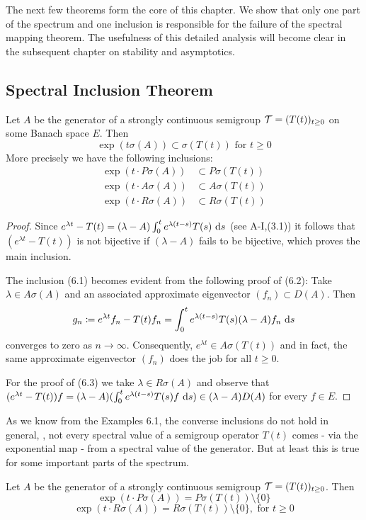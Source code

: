 The next few theorems form the core of this chapter. 
We show that only one part of the spectrum and one inclusion is responsible for the failure of the spectral mapping theorem.
The usefulness of this detailed analysis will become clear in the subsequent chapter on stability and asymptotics.
\subsection{Spectral Inclusion Theorem}\label{subsec:a3-6.2}
Let $A$ be the generator of a strongly continuous semigroup $\mathcal{T} = (T(t))_{t \geq 0}$ on some Banach space $E$.
Then
\[
\exp(t\sigma(A)) \subset \sigma(T(t)) \text{ for } t \geq 0
\]
More precisely we have the following inclusions:
\begin{align}
\exp(t \cdot P\sigma(A)) &\subset P\sigma(T(t)) \label{eq:a3-6.1} \\
\exp(t \cdot A\sigma(A)) &\subset A\sigma(T(t)) \label{eq:a3-6.2} \\
\exp(t \cdot R\sigma(A)) &\subset R\sigma(T(t)) \label{eq:a3-6.3}
\end{align}
\begin{proof}
Since $e^{\lambda t} - T(t) = (\lambda - A)\int_{0}^{t} e^{\lambda(t-s)}T(s) \, \mathop{}\!\mathrm{d}{s}$ (see A-I,(3.1)) it follows that $(e^{\lambda t} - T(t))$ is not bijective if $(\lambda - A)$ fails to be bijective, which proves the main inclusion.

The inclusion (6.1) becomes evident from the following proof of (6.2): Take $\lambda \in A\sigma(A)$ and an associated approximate eigenvector $(f_{n}) \subset D(A)$.
Then
\[
g_{n} \coloneqq e^{\lambda t}f_{n} - T(t)f_{n} = \int_{0}^{t} e^{\lambda(t-s)}T(s)(\lambda-A)f_{n} \, \mathop{}\!\mathrm{d}{s}
\]
converges to zero as $n \to \infty$.
Consequently, $e^{\lambda t} \in A\sigma(T(t))$ and in fact, the same approximate eigenvector $(f_{n})$ does the job for all $t \geq 0$.

For the proof of (6.3) we take $\lambda \in R\sigma(A)$ and observe that $(e^{\lambda t} - T(t))f = (\lambda - A)(\int_{0}^{t} e^{\lambda(t-s)}T(s)f \, \mathop{}\!\mathrm{d}{s}) \in (\lambda - A)D(A)$ for every $f \in E$.
\end{proof}
As we know from the Examples 6.1, the converse inclusions do not hold in general, \ie, not every spectral value of a semigroup operator $T(t)$ comes - via the exponential map - from a spectral value of the generator.
But at least this is true for some important parts of the spectrum.
\begin{theorem}\label{thm:a3-6.3}
Let $A$ be the generator of a strongly continuous semigroup $\mathcal{T} = (T(t))_{t \geq 0}$.
Then
\begin{equation}\label{eq:a3-6.4}
\exp(t \cdot P\sigma(A)) = P\sigma(T(t)) \setminus \{0\}
\end{equation}
\begin{equation}\label{eq:a3-6.5}
\exp(t \cdot R\sigma(A)) = R\sigma(T(t)) \setminus \{0\}, \text{ for } t \geq 0
\end{equation}
\end{theorem}
